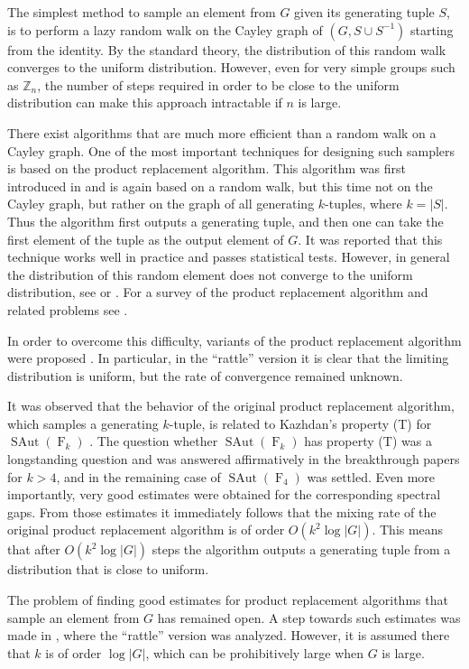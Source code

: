 \documentclass[12pt]{amsart}
\theoremstyle{definition}
\numberwithin{figure}{section}
\numberwithin{table}{section}
\numberwithin{equation}{section}
\newcommand{\SAut}{\operatorname{SAut}}
\newcommand{\F}{\operatorname{F}}
\newcommand{\BB}[1]{{\mathbb #1}}
\begin{document}
The simplest method to sample an element from $G$ given its generating tuple $S$, is to perform a lazy random walk on the Cayley graph of $(G,S \cup S^{-1})$ starting from the identity. By the standard theory, the distribution of this random walk converges to the uniform distribution. However, even for very simple groups such as $\BB Z_n$, the number of steps required in order to be close to the uniform distribution can make this approach intractable if $n$ is large. 

There exist algorithms that are much more efficient than a random walk on a Cayley graph. One of the most important techniques for designing such samplers is based on the product replacement algorithm. This algorithm was first introduced in \cite{MR1356111} and is again based on a random walk, but this time not on the Cayley graph, but rather on the graph of all generating $k$-tuples, where $k = |S|$. Thus the algorithm first outputs a generating tuple, and then one can take the first element of the tuple as the output element of $G$. It was reported that this technique works well in practice and passes statistical tests. However, in general the distribution of this random element does not converge to the uniform distribution, see \cite{MR2053017} or . For a survey of the product replacement algorithm and related problems see \cite{MR1829489}.

In order to overcome this difficulty, variants of the product replacement algorithm were proposed \cite{MR1929718}. In particular, in the ``rattle'' version it is clear that the limiting distribution is uniform, but the rate of convergence remained unknown.

It was observed that the behavior of the original product replacement algorithm, which samples a generating $k$-tuple, is related to Kazhdan's property (T) for $\SAut(\F_k)$ \cite{MR1815215}. The question whether $\SAut(\F_k)$ has property (T) was a longstanding question and was answered affirmatively in the breakthrough papers \cite{MR4224715, MR4023374} for $k>4$, and in \cite{nitsche2022computerproofspropertyt} the remaining case of $\SAut(\F_4)$ was settled. Even more importantly, very good estimates were obtained for the corresponding spectral gaps. From those estimates it immediately follows that the mixing rate of the original product replacement algorithm is of order $O(k^2\log|G|)$. This means that after $O(k^2\log|G|)$ steps the algorithm outputs a generating tuple from a distribution that is close to uniform.

The problem of finding good estimates for product replacement algorithms that sample an element from $G$ has remained open. A step towards such estimates was made in \cite{MR4709065}, where the ``rattle'' version was analyzed. However, it is assumed there that $k$ is of order $\log|G|$, which can be prohibitively large when $G$ is large. 
\end{document}
